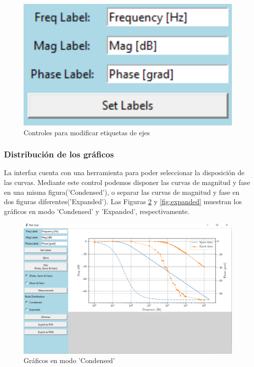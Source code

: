 \begin{figure}[ht]
\centering
\includegraphics[scale=0.3]{resources/labelsControl.png}
\caption{Controles para modificar etiquetas de ejes}
\label{fig:labesControl}
\end{figure}

\subsubsection{Distribución de los gráficos}
La interfaz cuenta con una herramienta para poder seleccionar la disposición de las curvas. Mediante este control podemos disponer las curvas de magnitud y fase en una misma figura('Condensed'), o separar las curvas de magnitud y fase en dos figuras diferentes('Expanded'). Las Figuras \ref{fig:condensed} y \ref{fig:expanded} muestran los gráficos en modo 'Condensed' y 'Expanded', respectivamente.

\begin{figure}[ht]
\centering
\includegraphics[scale=0.15]{resources/condensed.png}
\caption{Gráficos en modo 'Condensed'}
\label{fig:condensed}
\end{figure}

